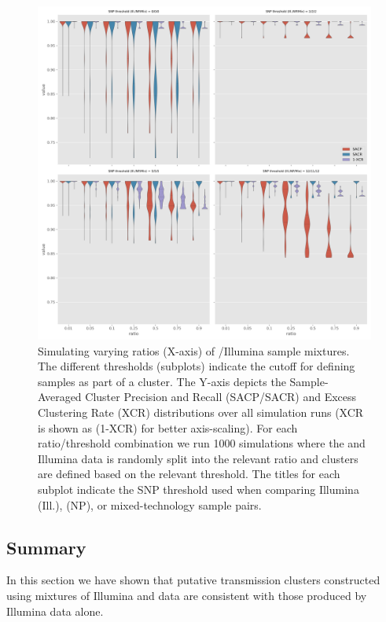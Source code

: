 \begin{figure}
\begin{center}
\includegraphics[width=0.90\columnwidth]{Chapter2/Figs/mixed_simulations.png}
\caption{{Simulating varying ratios (X-axis) of \ont{}/Illumina sample mixtures.
The different thresholds (subplots) indicate the cutoff for defining
samples as part of a cluster. The Y-axis depicts the Sample-Averaged
Cluster Precision and Recall (SACP/SACR) and Excess Clustering Rate
(XCR) distributions over all simulation runs (XCR is shown as (1-XCR)
for better axis-scaling). For each ratio/threshold combination we run
1000 simulations where the \ont{} and Illumina data is randomly split
into the relevant ratio and clusters are defined based on the relevant
threshold. The titles for each subplot indicate the SNP threshold used
when comparing Illumina (Ill.), \ont{} (NP), or mixed-technology
sample pairs.
{\label{fig:mixed-sims}}%
}}
\end{center}
\end{figure}

\subsection{Summary}

In this section we have shown that putative transmission clusters constructed using mixtures of Illumina and \ont{} data are consistent with those produced by Illumina data alone.

